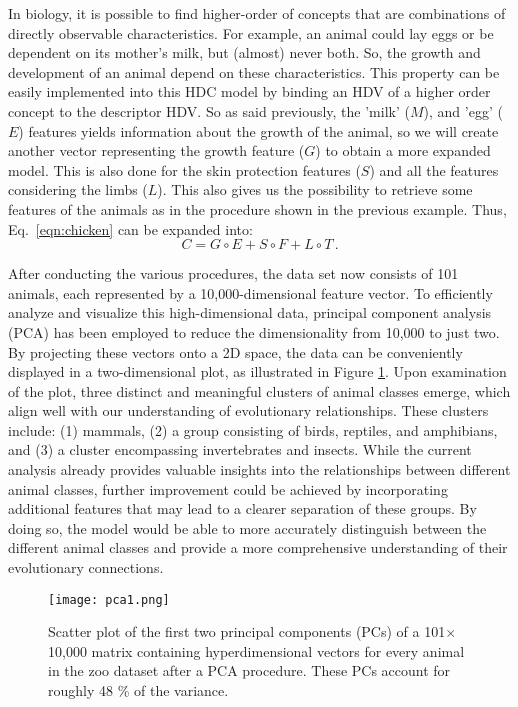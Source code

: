 In biology, it is possible to find higher-order of concepts that are combinations of directly observable characteristics. For example, an animal could lay eggs or be dependent on its mother's milk, but (almost) never both. So, the growth and development of an animal depend on these characteristics. This property can be easily implemented into this HDC model by binding an HDV of a higher order concept to the descriptor HDV. So as said previously, the 'milk' ($M$), and 'egg' ($E$) features yields information about the growth of the animal, so we will create another vector representing the growth feature ($G$) to obtain a more expanded model. This is also done for the skin protection features ($S$) and all the features considering the limbs ($L$). This also gives us the possibility to retrieve some features of the animals as in the procedure shown in the previous example. Thus, Eq.~\ref{eqn:chicken} can be expanded into:
\begin{equation}
    C = G \circ E + S \circ F + L \circ T\,.
\end{equation}

After conducting the various procedures, the data set now consists of 101 animals, each represented by a 10,000-dimensional feature vector. To efficiently analyze and visualize this high-dimensional data, principal component analysis (PCA) has been employed to reduce the dimensionality from 10,000 to just two. By projecting these vectors onto a 2D space, the data can be conveniently displayed in a two-dimensional plot, as illustrated in Figure \ref{fig:exm2}. Upon examination of the plot, three distinct and meaningful clusters of animal classes emerge, which align well with our understanding of evolutionary relationships. These clusters include: (1) mammals, (2) a group consisting of birds, reptiles, and amphibians, and (3) a cluster encompassing invertebrates and insects. While the current analysis already provides valuable insights into the relationships between different animal classes, further improvement could be achieved by incorporating additional features that may lead to a clearer separation of these groups. By doing so, the model would be able to more accurately distinguish between the different animal classes and provide a more comprehensive understanding of their evolutionary connections.
\begin{figure}[h]
    \centering
    \texttt{[image: pca1.png]}
    \caption{Scatter plot of the first two principal components (PCs) of a 101$\times$10,000 matrix containing hyperdimensional vectors for every animal in the zoo dataset after a PCA procedure. These PCs account for roughly 48 \% of the variance.}
    \label{fig:exm2}
\end{figure}

